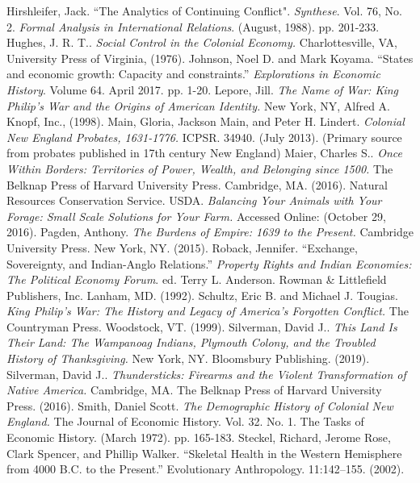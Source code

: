\documentclass[11pt, oneside]{article}
\begin{document}
\begin{thebibliography}{1}
 Hirshleifer, Jack. ``The Analytics of Continuing Conflict". \textit{Synthese}. Vol. 76, No. 2. {\em Formal Analysis in International Relations}. (August, 1988). pp. 201-233.
\smallskip
{} Hughes, J. R. T.. {\em Social Control in the Colonial Economy.}  Charlottesville, VA, University Press of Virginia, (1976).
\smallskip
{} Johnson, Noel D. and Mark Koyama. ``States and economic growth: Capacity and constraints.'' {\em Explorations in Economic History}. Volume 64. April 2017. pp. 1-20.
\smallskip
{} Lepore, Jill. {\em The Name of War:  King Philip's War and the Origins of American Identity.}  New York, NY, Alfred A. Knopf, Inc., (1998).
\smallskip
{} Main, Gloria, Jackson Main, and Peter H. Lindert. {\em Colonial New England Probates, 1631-1776.} ICPSR. 34940. (July 2013).
(Primary source from probates published in 17th century New England)
\smallskip
{} Maier, Charles S.. {\em Once Within Borders:  Territories of Power, Wealth, and Belonging since 1500.}  The Belknap Press of Harvard University Press. Cambridge, MA. (2016).
\smallskip
{} Natural Resources Conservation Service. USDA. {\em Balancing Your Animals with Your Forage:  Small Scale Solutions for Your Farm.}  Accessed Online:  (October 29, 2016). 
\smallskip
{} Pagden, Anthony. {\em The Burdens of Empire:  1639 to the Present.}  Cambridge University Press. New York, NY. (2015).
\smallskip
{} Roback, Jennifer. ``Exchange, Sovereignty, and Indian-Anglo Relations.'' {\em Property Rights and Indian Economies: The Political Economy Forum}. ed. Terry L. Anderson. Rowman \& Littlefield Publishers, Inc. Lanham, MD. (1992).
\smallskip
{} Schultz, Eric B. and Michael J. Tougias. {\em King Philip's War: The History and Legacy of America's Forgotten Conflict.}  The Countryman Press. Woodstock, VT. (1999).
\smallskip
{} Silverman, David J.. {\em This Land Is Their Land: The Wampanoag Indians, Plymouth Colony, and the Troubled History of Thanksgiving.}  New York, NY. Bloomsbury Publishing. (2019).
\smallskip
{} Silverman, David J.. {\em Thundersticks:  Firearms and the Violent Transformation of Native America.}  Cambridge, MA. The Belknap Press of Harvard University Press. (2016).
 Smith, Daniel Scott. {\em The Demographic History of Colonial New England.} The Journal of Economic History. Vol. 32. No. 1. The Tasks of Economic History. (March 1972). pp. 165-183.
\smallskip
{} Steckel, Richard, Jerome Rose, Clark Spencer, and Phillip Walker. ``Skeletal Health in the Western Hemisphere from 4000 B.C. to the Present.'' Evolutionary Anthropology. 11:142–155. (2002).

\end{thebibliography}
\end{document}

